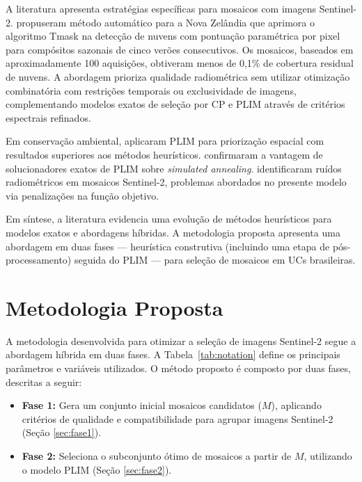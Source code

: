 \documentclass[a4paper,11pt]{article}
\begin{document}
A literatura apresenta estratégias específicas para mosaicos com imagens Sentinel-2. \citet{shepherd2020automated} propuseram método automático para a Nova Zelândia que aprimora o algoritmo Tmask na detecção de nuvens com pontuação paramétrica por pixel para compósitos sazonais de cinco verões consecutivos. Os mosaicos, baseados em aproximadamente 100 aquisições, obtiveram menos de 0,1\% de cobertura residual de nuvens. A abordagem prioriza qualidade radiométrica sem utilizar otimização combinatória com restrições temporais ou exclusividade de imagens, complementando modelos exatos de seleção por CP e PLIM \citep{combarro-simon-constraint-2023} através de critérios espectrais refinados.

Em conservação ambiental, \citet{beyer:2016} aplicaram PLIM para priorização espacial com resultados superiores aos métodos heurísticos. \citet{schuster:2020} confirmaram a vantagem de solucionadores exatos de PLIM sobre \textit{simulated annealing}. \citet{rodriguez-puerta:2024} identificaram ruídos radiométricos em mosaicos Sentinel-2, problemas abordados no presente modelo via penalizações na função objetivo.

Em síntese, a literatura evidencia uma evolução de métodos heurísticos para modelos exatos e abordagens híbridas. A metodologia proposta apresenta uma abordagem em duas fases --- heurística construtiva (incluindo uma etapa de pós-processamento) seguida do PLIM --- para seleção de mosaicos em UCs brasileiras.

\vspace{-7mm}

\section{Metodologia Proposta}
\vspace{-5mm}
A metodologia desenvolvida para otimizar a seleção de imagens Sentinel-2 segue a abordagem híbrida em duas fases. A Tabela~\ref{tab:notation} define os principais parâmetros e variáveis utilizados. O método proposto é composto por duas fases, descritas a seguir:
\vspace{-4mm}

\begin{itemize}
    
    \item \textbf{Fase 1:}%
    Gera um conjunto inicial mosaicos candidatos ($M$), aplicando critérios de qualidade e compatibilidade para agrupar imagens Sentinel-2 (Seção \ref{sec:fase1}).
    \vspace{-1mm}
    \item \textbf{Fase 2:}%
    Seleciona o subconjunto ótimo de mosaicos a partir de $M$, utilizando o modelo PLIM (Seção \ref{sec:fase2}).
\end{itemize}
\end{document}
